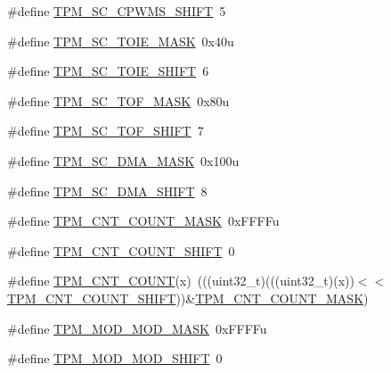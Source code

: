\begin{DoxyCompactItemize}
\#define \hyperlink{group___t_p_m___register___masks_ga1bf84a093f66cf0f37c7b77ee16c32b3}{T\+P\+M\+\_\+\+S\+C\+\_\+\+C\+P\+W\+M\+S\+\_\+\+S\+H\+I\+FT}~5
\item 
\#define \hyperlink{group___t_p_m___register___masks_ga67bad1290533531584e40005c865380d}{T\+P\+M\+\_\+\+S\+C\+\_\+\+T\+O\+I\+E\+\_\+\+M\+A\+SK}~0x40u
\item 
\#define \hyperlink{group___t_p_m___register___masks_ga6ab65f7b4d48095133fd762e1595eb3a}{T\+P\+M\+\_\+\+S\+C\+\_\+\+T\+O\+I\+E\+\_\+\+S\+H\+I\+FT}~6
\item 
\#define \hyperlink{group___t_p_m___register___masks_gae25305cad922790ffe882f8d4d423439}{T\+P\+M\+\_\+\+S\+C\+\_\+\+T\+O\+F\+\_\+\+M\+A\+SK}~0x80u
\item 
\#define \hyperlink{group___t_p_m___register___masks_gaa58c9acc6863e92d142671b2da4b60a5}{T\+P\+M\+\_\+\+S\+C\+\_\+\+T\+O\+F\+\_\+\+S\+H\+I\+FT}~7
\item 
\#define \hyperlink{group___t_p_m___register___masks_ga5d17b5a81f3f84eee65c94d5b0e7eca6}{T\+P\+M\+\_\+\+S\+C\+\_\+\+D\+M\+A\+\_\+\+M\+A\+SK}~0x100u
\item 
\#define \hyperlink{group___t_p_m___register___masks_ga04279ab580223012d6e172ce92a5f8c5}{T\+P\+M\+\_\+\+S\+C\+\_\+\+D\+M\+A\+\_\+\+S\+H\+I\+FT}~8
\item 
\#define \hyperlink{group___t_p_m___register___masks_gae4ca4e3ce211106290e584675dab1d28}{T\+P\+M\+\_\+\+C\+N\+T\+\_\+\+C\+O\+U\+N\+T\+\_\+\+M\+A\+SK}~0x\+F\+F\+F\+Fu
\item 
\#define \hyperlink{group___t_p_m___register___masks_gabc68cb7f4dfd853021c35f9cad5b05e2}{T\+P\+M\+\_\+\+C\+N\+T\+\_\+\+C\+O\+U\+N\+T\+\_\+\+S\+H\+I\+FT}~0
\item 
\#define \hyperlink{group___t_p_m___register___masks_ga5b121b9bc3cc5527202fc0e64eae37fd}{T\+P\+M\+\_\+\+C\+N\+T\+\_\+\+C\+O\+U\+NT}(x)~(((uint32\+\_\+t)(((uint32\+\_\+t)(x))$<$$<$\hyperlink{group___t_p_m___register___masks_gabc68cb7f4dfd853021c35f9cad5b05e2}{T\+P\+M\+\_\+\+C\+N\+T\+\_\+\+C\+O\+U\+N\+T\+\_\+\+S\+H\+I\+FT}))\&\hyperlink{group___t_p_m___register___masks_gae4ca4e3ce211106290e584675dab1d28}{T\+P\+M\+\_\+\+C\+N\+T\+\_\+\+C\+O\+U\+N\+T\+\_\+\+M\+A\+SK})
\item 
\#define \hyperlink{group___t_p_m___register___masks_ga547f0f1f80a59cf7a5c19b6e5ee66055}{T\+P\+M\+\_\+\+M\+O\+D\+\_\+\+M\+O\+D\+\_\+\+M\+A\+SK}~0x\+F\+F\+F\+Fu
\item 
\#define \hyperlink{group___t_p_m___register___masks_gad3b8c1cb94d29448d0eef30e94d65299}{T\+P\+M\+\_\+\+M\+O\+D\+\_\+\+M\+O\+D\+\_\+\+S\+H\+I\+FT}~0
$$
\end{DoxyCompactItemize}
